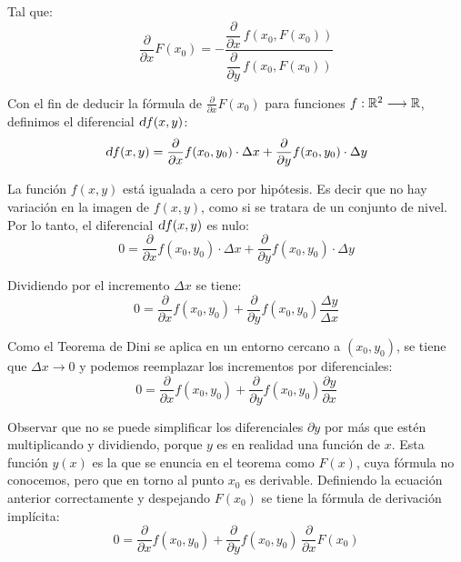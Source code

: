\documentclass[a5paper,12pt,twoside]{book}
\begin{document}
Tal que:
\begin{equation*}
    \frac{\partial}{\partial x} F(x_0) = - \dfrac{\dfrac{\partial}{\partial x} \, f \left( x_0,F(x_0) \right)}{\dfrac{\partial}{\partial y} \, f \left( x_0,F(x_0) \right)}
\end{equation*}


Con el fin de deducir la fórmula de $\tfrac{\partial}{\partial x} F(x_0)$ para funciones $f:\mathbb{R}^2 \longrightarrow \mathbb{R}$, definimos el diferencial $\textsl{d} f(x,y)$:
\begin{equation*}
    \textsl{d} f(x,y) = \dfrac{\partial}{\partial x} f(x_0,y_0) \cdot \Delta x + \dfrac{\partial}{\partial y} f(x_0,y_0) \cdot \Delta y
\end{equation*}

La función $f(x,y)$ está igualada a cero por hipótesis. Es decir que no hay variación en la imagen de $f(x,y)$, como si se tratara de un conjunto de nivel. Por lo tanto, el diferencial $\textsl{d} f(x,y)$ es nulo:
\begin{equation*}
    0 = \dfrac{\partial}{\partial x} f(x_0,y_0) \cdot \Delta x + \dfrac{\partial}{\partial y} f(x_0,y_0) \cdot \Delta y
\end{equation*}

Dividiendo por el incremento $\Delta x$ se tiene:
\begin{equation*}
    0 = \dfrac{\partial}{\partial x} f(x_0,y_0)+ \dfrac{\partial}{\partial y} f(x_0,y_0) \dfrac{\Delta y}{\Delta x}
\end{equation*}

Como el Teorema de Dini se aplica en un entorno cercano a $(x_0,y_0)$, se tiene que $\Delta x \to 0$ y podemos reemplazar los incrementos por diferenciales:
\begin{equation*}
    0 = \dfrac{\partial}{\partial x} f(x_0,y_0)+ \dfrac{\partial}{\partial y} f(x_0,y_0) \dfrac{\partial y}{\partial x}
\end{equation*}

Observar que no se puede simplificar los diferenciales $\partial y$ por más que estén multiplicando y dividiendo, porque $y$ es en realidad una función de $x$. Esta función $y(x)$ es la que se enuncia en el teorema como $F(x)$, cuya fórmula no conocemos, pero que en torno al punto $x_0$ es derivable. Definiendo la ecuación anterior correctamente y despejando $F(x_0)$ se tiene la fórmula de derivación implícita:
\begin{equation*}
    0 = \frac{\partial}{\partial x} f(x_0,y_0)+ \frac{\partial}{\partial y} f(x_0,y_0) \, \frac{\partial}{\partial x} F(x_0)
\end{equation*}
\end{document}
